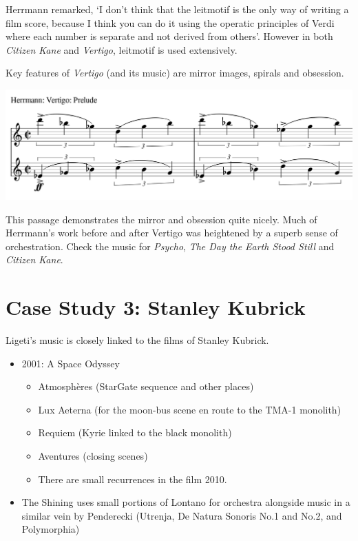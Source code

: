 \begin{itemize}
Herrmann remarked, `I don't think that the leitmotif is the only way of writing a film score, because I think you can do it using the operatic principles of Verdi where each number is separate and not derived from others'. However in both \textit{Citizen Kane} and \textit{Vertigo}, leitmotif is used extensively. 

Key features of \textit{Vertigo} (and its music) are mirror images, spirals and obsession. 

\includegraphics[scale=0.8]{herrmann-prelude} 

This passage demonstrates the mirror and obsession quite nicely. Much of Herrmann's work before and after Vertigo was heightened by a superb sense of orchestration. Check the music for \textit{Psycho}, \textit{The Day the Earth Stood Still} and \textit{Citizen Kane}. 
\end{itemize}




\section{Case Study 3: Stanley Kubrick}
Ligeti's music is closely linked to the films of Stanley Kubrick. 
\begin{itemize}
\item 2001: A Space Odyssey
\begin{itemize}
\item Atmosphères (StarGate sequence and other places) 
\item Lux Aeterna (for the moon-bus scene en route to the TMA-1 monolith)
\item Requiem (Kyrie linked to the black monolith)
\item Aventures (closing scenes)
\item There are small recurrences in the film 2010.
\end{itemize}
\item The Shining uses small portions of Lontano for orchestra alongside music in a similar vein by Penderecki (Utrenja, De Natura Sonoris No.1 and No.2, and Polymorphia)
\end{itemize}



